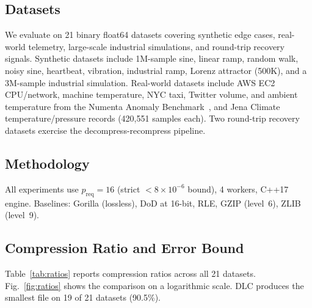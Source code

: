 \documentclass[runningheads]{llncs}
\begin{document}
\subsection{Datasets}

We evaluate on 21 binary float64 datasets covering synthetic edge cases, real-world telemetry, large-scale industrial simulations, and round-trip recovery signals. Synthetic datasets include 1M-sample sine, linear ramp, random walk, noisy sine, heartbeat, vibration, industrial ramp, Lorenz attractor (500K), and a 3M-sample industrial simulation. Real-world datasets include AWS EC2 CPU/network, machine temperature, NYC taxi, Twitter volume, and ambient temperature from the Numenta Anomaly Benchmark~\cite{numenta2017}, and Jena Climate temperature/pressure records (420,551 samples each). Two round-trip recovery datasets exercise the decompress-recompress pipeline.

\subsection{Methodology}

All experiments use $p_{\text{req}} = 16$ (strict $<8 \times 10^{-6}$ bound), 4 workers, C++17 engine. Baselines: Gorilla (lossless), DoD at 16-bit, RLE, GZIP (level~6), ZLIB (level~9).

\subsection{Compression Ratio and Error Bound}

Table~\ref{tab:ratios} reports compression ratios across all 21 datasets. Fig.~\ref{fig:ratios} shows the comparison on a logarithmic scale. DLC produces the smallest file on 19 of 21 datasets (90.5\%).
\end{document}
